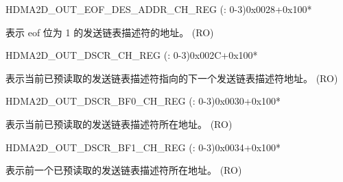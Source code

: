 \begin{register}{H}{DMA2D\_OUT\_EOF\_DES\_ADDR\_CH\_REG (: 0-3)}{0x0028+0x100*}\label{regdesc:DMA2DOUTEOFDESADDRCHNREG}
%
\regnewline%
\begin{regdesc}\begin{reglist}
\label{fielddesc:DMA2DOUTEOFDESADDRCHN}\item [DMA2D\_OUT\_EOF\_DES\_ADDR\_CH\regindex{n}] 表示 eof 位为 1 的发送链表描述符的地址。 (RO)
\end{reglist}\end{regdesc}
\end{register}


\begin{register}{H}{DMA2D\_OUT\_DSCR\_CH\_REG (: 0-3)}{0x002C+0x100*}\label{regdesc:DMA2DOUTDSCRCHNREG}
%
\regnewline%
\begin{regdesc}\begin{reglist}
\label{fielddesc:DMA2DOUTLINKDSCRCHN}\item [DMA2D\_OUTLINK\_DSCR\_CH\regindex{n}] 表示当前已预读取的发送链表描述符指向的下一个发送链表描述符地址。 (RO)
\end{reglist}\end{regdesc}
\end{register}


\begin{register}{H}{DMA2D\_OUT\_DSCR\_BF0\_CH\_REG (: 0-3)}{0x0030+0x100*}\label{regdesc:DMA2DOUTDSCRBF0CHNREG}
%
\regnewline%
\begin{regdesc}\begin{reglist}
\label{fielddesc:DMA2DOUTLINKDSCRBF0CHN}\item [DMA2D\_OUTLINK\_DSCR\_BF0\_CH\regindex{n}] 表示当前已预读取的发送链表描述符所在地址。 (RO)
\end{reglist}\end{regdesc}
\end{register}


\begin{register}{H}{DMA2D\_OUT\_DSCR\_BF1\_CH\_REG (: 0-3)}{0x0034+0x100*}\label{regdesc:DMA2DOUTDSCRBF1CHNREG}
%
\regnewline%
\begin{regdesc}\begin{reglist}
\label{fielddesc:DMA2DOUTLINKDSCRBF1CHN}\item [DMA2D\_OUTLINK\_DSCR\_BF1\_CH\regindex{n}] 表示前一个已预读取的发送链表描述符所在地址。 (RO)
\end{reglist}\end{regdesc}
\end{register}


